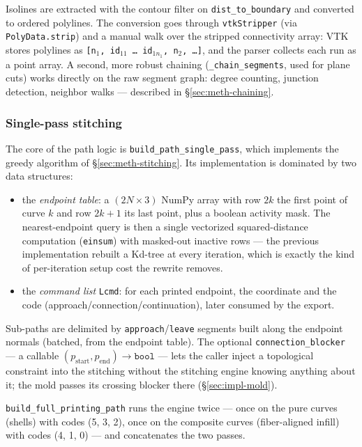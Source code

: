 Isolines are extracted with the contour filter on
\texttt{dist\_to\_boundary} and converted to ordered polylines. The
conversion goes through \texttt{vtkStripper} (via
\texttt{PolyData.strip}) and a manual walk over the stripped
connectivity array: VTK stores polylines as
\texttt{[n$_1$, id$_{11}$\,\dots\,id$_{1n_1}$, n$_2$, \dots]}, and the
parser collects each run as a point array. A second, more robust
chaining (\texttt{\_chain\_segments}, used for plane cuts) works
directly on the raw segment graph: degree counting, junction detection,
neighbor walks --- described in \S\ref{sec:meth-chaining}.

\subsubsection{Single-pass stitching}

The core of the path logic is \texttt{build\_path\_single\_pass},
which implements the greedy algorithm of \S\ref{sec:meth-stitching}.
Its implementation is dominated by two data structures:

\begin{itemize}
  \item the \emph{endpoint table}: a $(2N \times 3)$ NumPy array with
        row $2k$ the first point of curve $k$ and row $2k+1$ its last
        point, plus a boolean activity mask. The nearest-endpoint query
        is then a single vectorized squared-distance computation
        (\texttt{einsum}) with masked-out inactive rows --- the
        previous implementation rebuilt a Kd-tree at every iteration,
        which is exactly the kind of per-iteration setup cost the
        rewrite removes.
  \item the \emph{command list} \texttt{Lcmd}: for each printed
        endpoint, the coordinate and the code
        (approach/connection/continuation), later consumed by the
        export.
\end{itemize}

Sub-paths are delimited by \texttt{approach}/\texttt{leave} segments
built along the endpoint normals (batched, from the endpoint table).
The optional \texttt{connection\_blocker} --- a callable
$(p_{\text{start}}, p_{\text{end}}) \to \texttt{bool}$ --- lets the
caller inject a topological constraint into the stitching without the
stitching engine knowing anything about it; the mold passes its
crossing blocker there (\S\ref{sec:impl-mold}).

\texttt{build\_full\_printing\_path} runs the engine twice --- once on
the pure curves (shells) with codes (5, 3, 2), once on the composite
curves (fiber-aligned infill) with codes (4, 1, 0) --- and concatenates
the two passes.


